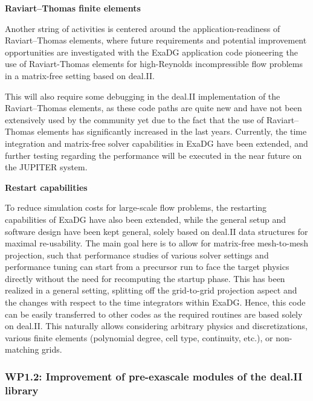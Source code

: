 \documentclass[a4paper,12pt, numbers]{article}
\begin{document}
\noindent\textbf{Raviart--Thomas finite elements}

Another string of activities is centered around the application-readiness of Raviart--Thomas elements, where future requirements and potential improvement opportunities are investigated with the ExaDG application code pioneering the use of Raviart-Thomas elements for high-Reynolds incompressible flow problems in a matrix-free setting based on deal.II.

This will also require some debugging in the deal.II implementation of the Raviart--Thomas elements, as these code paths are quite new and have not been extensively used by the community yet due to the fact that the use of Raviart--Thomas elements has significantly increased in the last years. Currently, the time integration and matrix-free solver capabilities in ExaDG have been extended, and further testing regarding the performance will be executed in the near future on the JUPITER system.

\noindent\textbf{Restart capabilities}

To reduce simulation costs for large-scale flow problems, the restarting capabilities of ExaDG have also been extended, while the general setup and software design have been kept general, solely based on deal.II data structures for maximal re-usability. The main goal here is to allow for matrix-free mesh-to-mesh projection, such that performance studies of various solver settings and performance tuning can start from a precursor run to face the target physics directly without the need for recomputing the startup phase. This has been realized in a general setting, splitting off the grid-to-grid projection aspect and the changes with respect to the time integrators within ExaDG. Hence, this code can be easily transferred to other codes as the required routines are based solely on deal.II. This naturally allows considering arbitrary physics and discretizations, various finite elements (polynomial degree, cell type, continuity, etc.), or non-matching grids.



\subsubsection*{WP1.2: Improvement of pre-exascale modules of the deal.II library} %
\end{document}
